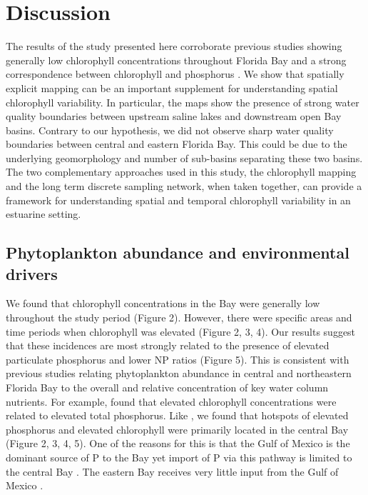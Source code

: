 \section{Discussion}
\label{discussion}

The results of the study presented here corroborate previous studies showing generally low chlorophyll concentrations throughout Florida Bay and a strong correspondence between chlorophyll and phosphorus \citep{fourqurean1993process, phlips_spatial_1996}. We show that spatially explicit mapping can be an important supplement for understanding spatial chlorophyll variability. In particular, the maps show the presence of strong water quality boundaries between upstream saline lakes and downstream open Bay basins. Contrary to our hypothesis, we did not observe sharp water quality boundaries between central and eastern Florida Bay. This could be due to the underlying geomorphology and number of sub-basins separating these two basins. The two complementary approaches used in this study, the chlorophyll mapping and the long term discrete sampling network, when taken together, can provide a framework for understanding spatial and temporal chlorophyll variability in an estuarine setting. 

\subsection{Phytoplankton abundance and environmental drivers}
\label{phytoabund}

We found that chlorophyll concentrations in the Bay were generally low throughout the study period (Figure 2). However, there were specific areas and time periods when chlorophyll was elevated (Figure 2, 3, 4). Our results suggest that these incidences are most strongly related to the presence of elevated particulate phosphorus and lower NP ratios (Figure 5). This is consistent with previous studies relating phytoplankton abundance in central and northeastern Florida Bay to the overall and relative concentration of key water column nutrients. For example, \citet{fourqurean1993process} found that elevated chlorophyll concentrations were related to elevated total phosphorus. Like \citet{fourqurean1993process}, we found that hotspots of elevated phosphorus and elevated chlorophyll were primarily located in the central Bay (Figure 2, 3, 4, 5). One of the reasons for this is that the Gulf of Mexico is the dominant source of P to the Bay yet import of P via this pathway is limited to the central Bay \citep{childers_relating_2006, rudnick1999phosphorus}. The eastern Bay receives very little input from the Gulf of Mexico \citep{lee2016circulation}. 

